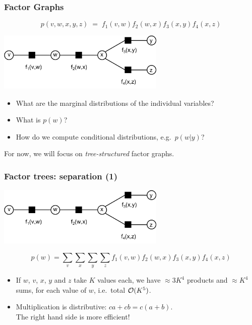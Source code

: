 \begin{frame}
\frametitle{Factor Graphs}

\[
p(v, w, x, y, z)\;=\;f_1(v, w)f_2(w, x)f_3(x, y)f_4(x, z)
\]

\centerline{\includegraphics[width=0.6\textwidth]{ExampleFactorGraph1}}

\begin{itemize}
\item What are the marginal distributions of the individual variables?
\item What is $p(w)$?
\item How do we compute conditional distributions, e.g.\ $p(w|y)$?
\end{itemize}

For now, we will focus on \emph{tree-structured} factor graphs.

\end{frame}


\begin{frame}
\frametitle{Factor trees: separation (1)}

\centerline{\includegraphics[width=0.6\textwidth]{ExampleFactorGraph1}
}
\[
p(w) = \sum_v\sum_x\sum_y\sum_z f_1(v,w)f_2(w,x)f_3(x,y)f_4(x,z)
\]
\begin{itemize}
\item If $w$, $v$, $x$, $y$ and $z$ take $K$ values each, we have $\approx 3K^4$ 
products and $\approx K^4$ sums, for each value of $w$, i.e.\ total ${\cal O}(K^5)$.
\item Multiplication is distributive: $ca + cb = c(a+b)$.\\ 
The right hand side is more efficient!
\end{itemize}

\hfill

\end{frame}


